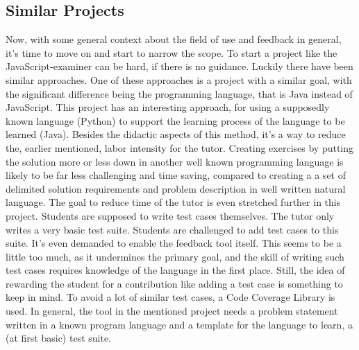 \documentclass{article}
\begin{document}
\subsection{Similar Projects}
Now, with some general context about the field of use and feedback in general,
it's time to move on and
start to narrow the scope. To start a project like the JavaScript-examiner can
be hard, if there is no guidance. Luckily there have been similar approaches. 
One of these approaches is a project with a similar goal, with the significant
difference being the programming language, that is Java instead of JavaScript. 
This project  \citep{o2014java} has an interesting approach, for using a 
supposedly known language (Python) to support the learning process of the 
language to be learned (Java). %
Besides the didactic aspects of this method, it's a way to reduce the,
earlier mentioned, labor intensity for the tutor. Creating exercises by 
putting the solution more or less down in another well known programming 
language is likely
to be far less challenging and time saving, compared to creating a
a set of delimited solution requirements and problem description
in well written natural language. The goal to reduce time of the tutor is even
stretched further in this project. Students are supposed to write test cases 
themselves. The tutor only writes a very basic test suite. Students are 
challenged to 
add test cases to this suite. It's even demanded to enable the feedback
tool itself. This seems to be a little too much, as it undermines the primary
goal, and the skill of writing such test cases requires knowledge of the
language in the first place. Still, the idea of rewarding the student for a
contribution like adding a test case is something to keep in mind. To avoid a 
lot of similar test cases, a Code Coverage Library is used. In general, 
the tool in the mentioned project needs a problem statement written in a known
program language and a template for the language to learn, a (at first basic) 
test suite.
\end{document}
